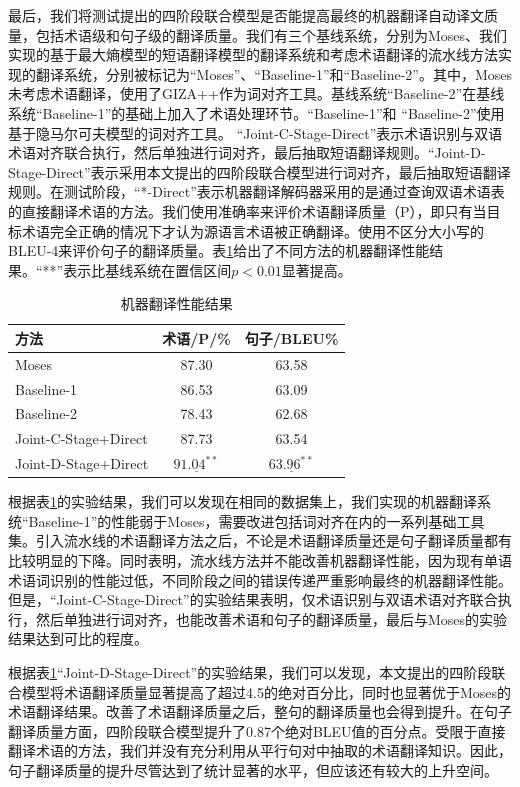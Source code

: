最后，我们将测试提出的四阶段联合模型是否能提高最终的机器翻译自动译文质量，包括术语级和句子级的翻译质量。我们有三个基线系统，分别为Moses、我们实现的基于最大熵模型的短语翻译模型的翻译系统和考虑术语翻译的流水线方法实现的翻译系统，分别被标记为“Moses”、“Baseline-1”和“Baseline-2”。其中，Moses未考虑术语翻译，使用了GIZA++作为词对齐工具。基线系统“Baseline-2”在基线系统“Baseline-1”的基础上加入了术语处理环节。“Baseline-1”和\linebreak
“Baseline-2”使用基于隐马尔可夫模型的词对齐工具。 “Joint-C-Stage-Direct”表示术语识别与双语术语对齐联合执行，然后单独进行词对齐，最后抽取短语翻译规则。“Joint-D-Stage-Direct”表示采用本文提出的四阶段联合模型进行词对齐，最后抽取短语翻译规则。在测试阶段，“*-Direct”表示机器翻译解码器采用的是通过查询双语术语表的直接翻译术语的方法。我们使用准确率来评价术语翻译质量（P），即只有当目标术语完全正确的情况下才认为源语言术语被正确翻译。使用不区分大小写的BLEU-4来评价句子的翻译质量。表\ref{Table_joint_term_mt_result}给出了不同方法的机器翻译性能结果。“**”表示比基线系统在置信区间$p<0.01$显著提高。

\begin{table}[!htbp]
	\centering
	\begin{tabular}{|l|c|c|}
		\hline
		方法  & 术语/P/\% & 句子/BLEU\% \\ 
		\hline
		Moses         & 87.30 & 63.58 \\ \hline
		Baseline-1    & 86.53 & 63.09 \\ \hline
		Baseline-2    & 78.43 & 62.68 \\ \hline
		Joint-C-Stage+Direct & 87.73 & 63.54 \\ \hline
		Joint-D-Stage+Direct & $\underline{91.04^{**}}$ & $\underline{63.96^{**}}$ \\
		\hline
	\end{tabular}
	\caption{机器翻译性能结果}
	\label{Table_joint_term_mt_result}
\end{table}

根据表\ref{Table_joint_term_mt_result}的实验结果，我们可以发现在相同的数据集上，我们实现的机器翻译系统“Baseline-1”的性能弱于Moses，需要改进包括词对齐在内的一系列基础工具集。引入流水线的术语翻译方法之后，不论是术语翻译质量还是句子翻译质量都有比较明显的下降。同时表明，流水线方法并不能改善机器翻译性能，因为现有单语术语词识别的性能过低，不同阶段之间的错误传递严重影响最终的机器翻译性能。但是，“Joint-C-Stage-Direct”的实验结果表明，仅术语识别与双语术语对齐联合执行，然后单独进行词对齐，也能改善术语和句子的翻译质量，最后与Moses的实验结果达到可比的程度。

根据表\ref{Table_joint_term_mt_result}“Joint-D-Stage-Direct”的实验结果，我们可以发现，本文提出的四阶段联合模型将术语翻译质量显著提高了超过4.5的绝对百分比，同时也显著优于Moses的术语翻译结果。改善了术语翻译质量之后，整句的翻译质量也会得到提升。在句子翻译质量方面，四阶段联合模型提升了0.87个绝对BLEU值的百分点。受限于直接翻译术语的方法，我们并没有充分利用从平行句对中抽取的术语翻译知识。因此，句子翻译质量的提升尽管达到了统计显著的水平，但应该还有较大的上升空间。

